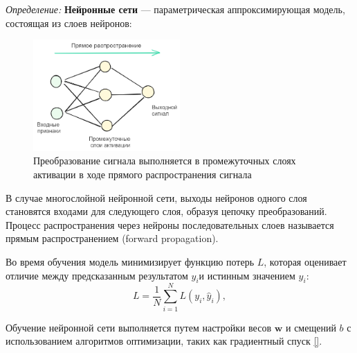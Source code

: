 \textit{Определение:} \textbf{Нейронные сети} --- параметрическая аппроксимирующая модель, состоящая из слоев нейронов:
\begin{figure}[h]
  \centering
  \includegraphics[width=0.5\textwidth]{assets/ml/nn/nn.excalidraw.png}
  \caption{Преобразование сигнала выполняется в промежуточных слоях активации в ходе прямого распространения сигнала}
  \label{neural_net}
\end{figure}

В случае многослойной нейронной сети, выходы нейронов одного слоя становятся входами для следующего слоя, 
образуя цепочку преобразований. Процесс распространения через нейроны последовательных слоев называется 
прямым распространением (forward propagation).

Во время обучения модель минимизирует функцию потерь \( L \), которая оценивает отличие между предсказанным 
результатом $y_i$и истинным значением $y_i$:
\begin{equation}
  L = \frac{1}{N} \sum_{i=1}^{N} L(y_i, \hat{y}_i),
\end{equation}

Обучение нейронной сети выполняется путем настройки весов \( \mathbf{w} \) и смещений \( b \) 
с использованием алгоритмов оптимизации, таких как градиентный спуск \ref{}. 
